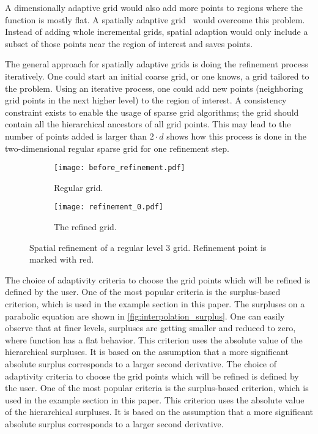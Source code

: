 A dimensionally adaptive grid would also add more points to regions where the function is mostly flat.
A spatially adaptive grid~\cite{pflueger10spatially} would overcome this problem. Instead of adding whole incremental grids,
spatial adaption would only include a subset of those points near the region of interest and saves points.

The general approach for spatially adaptive grids is doing the refinement process iteratively. One could start an initial coarse grid, or one knows, a grid tailored to the problem. Using an iterative process, one could add new points (neighboring grid points in the next higher level) to the region of interest. A consistency constraint exists to enable the usage of sparse grid algorithms; the grid should contain all the hierarchical ancestors of all grid points. This may lead to the number of points added is larger than \( 2 \cdot d \)  shows how this process is done in the two-dimensional regular sparse grid for one refinement step.

\begin{figure}
    \centering
    \begin{subfigure}{0.22\textwidth}
        \texttt{[image: before\_refinement.pdf]}
        \caption{Regular grid.}
        \label{fig:regularlevel3}
    \end{subfigure}%
    \begin{subfigure}{0.22\textwidth}
        \texttt{[image: refinement\_0.pdf]}
        \caption{The refined grid.}
    \end{subfigure}
    \caption{Spatial refinement of a regular level 3 grid. Refinement point is marked with red.}
    \label{fig:spatialrefinement}
\end{figure}

The choice of adaptivity criteria to choose the grid points which will be refined is defined by the user. One of the most popular criteria is the surplus-based criterion, which is used in the example section in this paper. The surpluses on a parabolic equation are shown in \cref{fig:interpolation_surplus}. One can easily observe that at finer levels, surpluses are getting smaller and reduced to zero, where function has a flat behavior. This criterion uses the absolute value of the hierarchical surpluses. It is based on the assumption that a more significant absolute surplus corresponds to a larger second derivative. The choice of adaptivity criteria to choose the grid points which will be refined is defined by the user. One of the most popular criteria is the surplus-based criterion, which is used in the example section in this paper. This criterion uses the absolute value of the hierarchical surpluses. It is based on the assumption that a more significant absolute surplus corresponds to a larger second derivative.